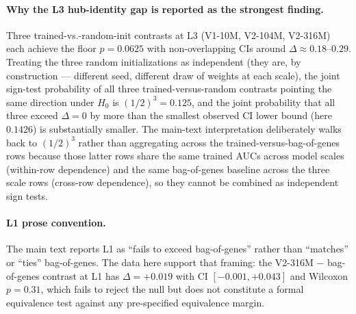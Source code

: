 \documentclass[11pt]{article}
\begin{document}
\paragraph{Why the L3 hub-identity gap is reported as the strongest finding.} Three trained-vs.-random-init contrasts at L3 (V1-10M, V2-104M, V2-316M) each achieve the floor $p = 0.0625$ with non-overlapping CIs around $\Delta \approx 0.18$--$0.29$. Treating the three random initializations as independent (they are, by construction --- different seed, different draw of weights at each scale), the joint sign-test probability of all three trained-versus-random contrasts pointing the same direction under $H_0$ is $(1/2)^3 = 0.125$, and the joint probability that all three exceed $\Delta = 0$ by more than the smallest observed CI lower bound (here $0.1426$) is substantially smaller. The main-text interpretation deliberately walks back to $(1/2)^3$ rather than aggregating across the trained-versus-bag-of-genes rows because those latter rows share the same trained AUCs across model scales (within-row dependence) and the same bag-of-genes baseline across the three scale rows (cross-row dependence), so they cannot be combined as independent sign tests.

\paragraph{L1 prose convention.} The main text reports L1 as ``fails to exceed bag-of-genes'' rather than ``matches'' or ``ties'' bag-of-genes. The data here support that framing: the V2-316M $-$ bag-of-genes contrast at L1 has $\Delta = +0.019$ with CI $[-0.001, +0.043]$ and Wilcoxon $p = 0.31$, which fails to reject the null but does not constitute a formal equivalence test against any pre-specified equivalence margin.
\end{document}
